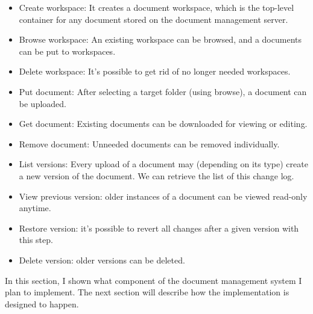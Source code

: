 \begin{itemize}
\item Create workspace: It creates a document workspace, which is the top-level
container for any document stored on the document management server.
\item Browse workspace: An existing workspace can be browsed, and a documents
can be put to workspaces.
\item Delete workspace: It's possible to get rid of no longer needed workspaces.
\item Put document: After selecting a target folder (using browse), a document
can be uploaded.
\item Get document: Existing documents can be downloaded for viewing or editing.
\item Remove document: Unneeded documents can be removed individually.
\item List versions: Every upload of a document may (depending on its type)
create a new version of the document. We can retrieve the list of this change log.
\item View previous version: older instances of a document can be viewed
read-only anytime.
\item Restore version: it's possible to revert all changes after a given
version with this step.
\item Delete version: older versions can be deleted.
\end{itemize}

In this section, I shown what component of the document management system I
plan to implement. The next section will describe how the implementation is
designed to happen.

